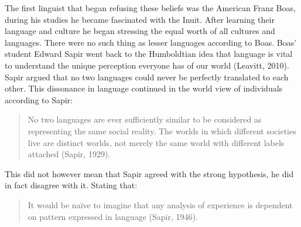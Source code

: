 The first linguist that began refusing these beliefs was the American Franz Boas, during his studies he became fascinated with the Inuit. After learning their language and culture he began stressing the equal worth of all cultures and languages. There were no such thing as lesser languages according to Boas. Boas’ student Edward Sapir went back to the Humboldtian idea that language is vital to understand the unique perception everyone has of our world (Leavitt, 2010). Sapir argued that no two languages could never be perfectly translated to each other. This dissonance in language continued in the world view of individuals according to Sapir: 

\begin{minipage}{\textwidth}
\begin{quote}
\begin{singlespace}
	No two languages are ever sufficiently similar to be considered as representing the same social reality. The worlds in which different societies live are distinct worlds, not merely the same world with different labels attached (Sapir, 1929).
\end{singlespace}
\end{quote}
\end{minipage}
\vspace{0.1cm}

This did not however mean that Sapir agreed with the strong hypothesis, he did in fact disagree with it. Stating that: 

\begin{quote}
\begin{singlespace}
	It would be naïve to imagine that any analysis of experience is dependent on pattern expressed in language (Sapir, 1946).
\end{singlespace}
\end{quote}

